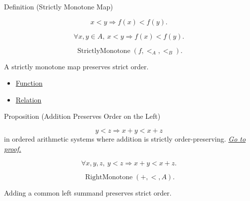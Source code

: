 \begin{definitionbox}{Definition (Strictly Monotone Map)}
\begin{definition}
\label{def:strictly-monotone-map}
\[
x<y \Longrightarrow f(x)<f(y).
\]
\end{definition}
\end{definitionbox}

\begin{remark*}
\[
\forall x,y\in A,\ x<y \Longrightarrow f(x)<f(y).
\]
\end{remark*}

\begin{remark*}
\[
\operatorname{StrictlyMonotone}(f,<_{A},<_{B}).
\]
\end{remark*}

\begin{remark*}[Interpretation]
A strictly monotone map preserves strict order.
\end{remark*}

\begin{dependencies}
\begin{itemize}
  \item \hyperref[def:function]{Function}
  \item \hyperref[def:relation]{Relation}
\end{itemize}
\end{dependencies}

\begin{propositionbox}{Proposition (Addition Preserves Order on the Left)}
\begin{proposition}
\label{prop:addition-order-compatibility-left}
\[
y<z \Longrightarrow x+y<x+z
\]
in ordered arithmetic systems where addition is strictly order-preserving.
\hyperref[prf:addition-order-compatibility-left]{\textit{Go to proof.}}
\end{proposition}
\end{propositionbox}

\begin{remark*}
\[
\forall x,y,z,\ y<z \Longrightarrow x+y<x+z.
\]
\end{remark*}

\begin{remark*}
\[
\operatorname{RightMonotone}(+,<,A).
\]
\end{remark*}

\begin{remark*}[Interpretation]
Adding a common left summand preserves strict order.
\end{remark*}

